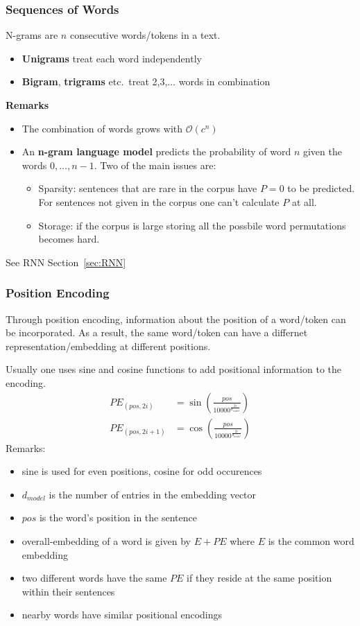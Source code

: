 \subsubsection{Sequences of Words}
N-grams are $n$ consecutive words/tokens in a text.
\begin{itemize}
    \item \textbf{Unigrams} treat each word independently
    \item \textbf{Bigram}, \textbf{trigrams} etc.\ treat 2,3,$\ldots$ words in combination
\end{itemize}
\textbf{Remarks}
\begin{itemize}
    \item The combination of words grows with $\mathcal{O}(c^n)$
    \item An \textbf{n-gram language model} predicts the probability of word $n$ given the words $0,\dots,n-1$. Two of the main issues are:
          \begin{itemize}
              \item Sparsity: sentences that are rare in the corpus have $P=0$ to be predicted. For sentences not given in the corpus one can't calculate $P$ at all.
              \item Storage: if the corpus is large storing all the possbile word permutations becomes hard.
          \end{itemize}
\end{itemize}

\newpar{}
See RNN Section~\ref{sec:RNN}

\subsubsection{Position Encoding}
Through position encoding, information about the position of a word/token can be incorporated. As a result, the same word/token can have a differnet representation/embedding at different positions.
\newpar{}

Usually one uses sine and cosine functions to add positional information to the encoding.
\begin{align*}
    PE_{(pos,2i)}   & =\sin\left(\frac{pos}{10000^{\frac{2i}{d_{model}}}}\right) \\
    PE_{(pos,2i+1)} & =\cos\left(\frac{pos}{10000^{\frac{2i}{d_{model}}}}\right)
\end{align*}
Remarks:
\begin{itemize}
    \item sine is used for even positions, cosine for odd occurences
    \item $d_{model}$ is the number of entries in the embedding vector
    \item $pos$ is the word's position in the sentence
    \item overall-embedding of a word is given by $E+PE$ where $E$ is the common word embedding
    \item two different words have the same $PE$ if they reside at the same position within their sentences
    \item nearby words have similar positional encodings
\end{itemize}

